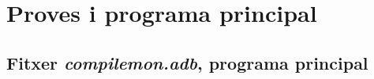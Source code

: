 \section{Proves i programa principal}

\subsection{Fitxer \emph{compilemon.adb}, programa principal}

\newpage

%

%

%

